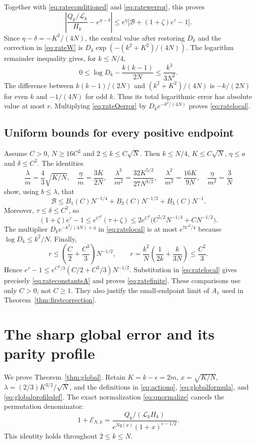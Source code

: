 \documentclass[11pt]{article}
\theoremstyle{definition}
\theoremstyle{remark}
\newcommand{\1}{\mathbf 1}
\begin{document}
Together with \eqref{eq:rateconditioned} and \eqref{eq:ratewerror}, this proves
\begin{equation}\label{eq:rateQerror}
\left|\frac{Q_k/\mathcal L_k}{H_k}-e^{\eta-\delta}\right|
\le e^\eta\bigl[\mathcal B+(1+\zeta)e^\tau-1\bigr].
\end{equation}
Since $\eta-\delta=-K^2/(4N)$, the central value after restoring $D_k$ and the correction in \eqref{eq:rateW} is
$D_k\exp(-(k^2+K^2)/(4N))$.
The logarithm remainder inequality gives, for $k\le N/4$,
\[
0\le\log D_k-\frac{k(k-1)}{2N}\le\frac{k^3}{3N^2}.
\]
The difference between $k(k-1)/(2N)$ and $(k^2+K^2)/(4N)$ is $-k/(2N)$ for even $k$ and $-1/(4N)$ for odd $k$. Thus its total logarithmic error has absolute value at most $r$. Multiplying \eqref{eq:rateQerror} by $D_ke^{-k^2/(4N)}$ proves \eqref{eq:ratelocal}.

\subsection{Uniform bounds for every positive endpoint}

Assume $C>0$, $N\ge16C^2$ and $2\le k\le C\sqrt N$. Then $k\le N/4$, $K\le C\sqrt N$, $\eta\le a$ and $\delta\le C^2$. The identities
\[
\frac\lambda m=\frac43\sqrt{K/N},\quad
\frac\eta m=\frac{3K}{2N},\quad
\frac{\lambda^3}{m^2}=\frac{32K^{5/2}}{27N^{3/2}},\quad
\frac{\lambda^2}{m^2}=\frac{16K}{9N},\quad
\frac\eta{m^2}=\frac3N
\]
show, using $b\le\lambda$, that
\[
\mathcal B\le B_1(C)N^{-1/4}+B_2(C)N^{-1/2}+B_3(C)N^{-1}.
\]
Moreover, $\tau\le\delta\le C^2$, so
\[
(1+\zeta)e^\tau-1
\le e^{C^2}(\tau+\zeta)
\le2e^{C^2}\bigl(C^{5/2}N^{-1/4}+CN^{-1/2}\bigr).
\]
The multiplier $D_ke^{-k^2/(4N)+\eta}$ in \eqref{eq:ratelocal} is at most $e^{7C^2/4}$ because $\log D_k\le k^2/N$. Finally,
\[
r\le\left(\frac C2+\frac{C^3}{3}\right)N^{-1/2},\qquad
r=\frac{k^2}{N}\left(\frac1{2k}+\frac{k}{3N}\right)\le\frac{C^2}{3}.
\]
Hence $e^r-1\le e^{C^2/3}(C/2+C^3/3)N^{-1/2}$. Substitution in \eqref{eq:ratelocal} gives precisely \eqref{eq:rateconstantsA} and proves \eqref{eq:ratefinite}. These comparisons use only $C>0$, not $C\ge1$. They also justify the small-endpoint limit of $A_1$ used in Theorem~\ref{thm:firstcorrection}.


\clearpage
\section{The sharp global error and its parity profile}\label{sec:globalsharpproof}

We prove Theorem~\ref{thm:global}. Retain $K=k-\epsilon=2m$, $x=\sqrt{K/N}$, $\lambda=(2/3)K^{3/2}/\sqrt N$, and the definitions in \eqref{eq:actionq}, \eqref{eq:globalformula}, and \eqref{eq:globalprofiledef}. The exact normalization \eqref{eq:qnormalize} cancels the permutation denominator:
\begin{equation}\label{eq:globalcancel}
1+\mathcal E_{N,k}
=\frac{Q_k/(\mathcal L_kH_k)}{e^{Nq(x)}(1+x)^{\epsilon-1/2}}.
\end{equation}
This identity holds throughout $2\le k\le N$.
\end{document}
